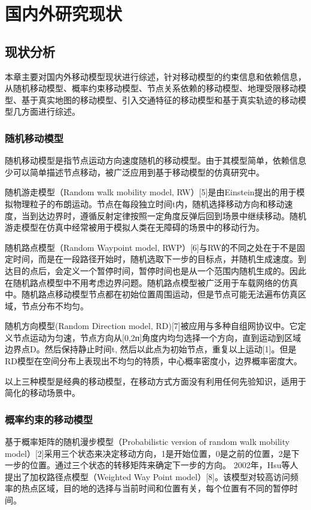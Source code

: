 \chapter{国内外研究现状}
\section{现状分析}
本章主要对国内外移动模型现状进行综述，针对移动模型的约束信息和依赖信息，从随机移动模型、概率约束移动模型、节点关系依赖的移动模型、地理受限移动模型、基于真实地图的移动模型、引入交通特征的移动模型和基于真实轨迹的移动模型几方面进行综述。
\subsection{随机移动模型}

随机移动模型是指节点运动方向速度随机的移动模型。由于其模型简单，依赖信息少可以简单描述节点移动，被广泛应用到基于移动模型的仿真研究中。

随机游走模型（Random walk mobility model, RW）[5]是由Einstein提出的用于模拟物理粒子的布朗运动。节点在每段独立时间t内，随机选择移动方向和移动速度，当到达边界时，遵循反射定律按照一定角度反弹后回到场景中继续移动。随机游走模型在仿真中经常被用于模拟人类在无障碍的场景中的移动行为。

随机路点模型（Random Waypoint model, RWP）[6]与RW的不同之处在于不是固定时间，而是在一段路径开始时，随机选取下一步的目标点，并随机生成速度。到达目的点后，会定义一个暂停时间，暂停时间也是从一个范围内随机生成的。因此在随机路点模型中不用考虑边界问题。随机路点模型被广泛用于车载网络的仿真中。随机路点移动模型节点都在初始位置周围运动，但是节点可能无法遍布仿真区域，节点分布不均匀。

随机方向模型(Random Direction model, RD)[7]被应用与多种自组网协议中。它定义节点运动为匀速，节点方向从[0,2ᴨ]角度内均匀选择一个方向，直到运动到区域边界点D。然后保持静止时间t, 然后以此点为初始节点，重复以上运动[1]。但是RD模型在空间分布上表现出不均匀的特质，中心概率密度小，边界概率密度大。

以上三种模型是经典的移动模型，在移动方式方面没有利用任何先验知识，适用于简化的移动场景中。

\subsection{概率约束的移动模型}
    基于概率矩阵的随机漫步模型（Probabilistic version of random walk mobility model）[2]采用三个状态来决定移动方向，1是开始位置，0是之前的位置，2是下一步的位置。通过三个状态的转移矩阵来确定下一步的方向。
2002年，Hsu等人提出了加权路径点模型（Weighted Way Point model）[8]。该模型对较高访问频率的热点区域，目的地的选择与当前时间和位置有关，每个位置有不同的暂停时间。
	
